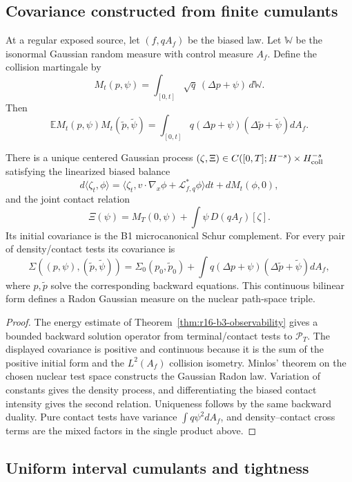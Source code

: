 \subsection{Covariance constructed from finite cumulants}

At a regular exposed source, let \((f,qA_f)\) be the biased law.  Let
\(\mathbb W\) be the isonormal Gaussian random measure with control measure
\(A_f\).  Define the collision martingale by
\[
 M_t(p,\psi)=
 \int_{[0,t]}\sqrt q\,(\Delta p+\psi)\,d\mathbb W.
\]
Then
\[
 \mathbb E M_t(p,\psi)M_t(\tilde p,\tilde\psi)
 =\int_{[0,t]}q(\Delta p+\psi)
   (\Delta\tilde p+\tilde\psi)dA_f.
\]

\begin{theorem}
\label{thm:r16-b3-covariance}
There is a unique centered Gaussian process
\((\zeta,\Xi)\in C([0,T];H^{-s})\times H^{-s}_{\rm coll}\) satisfying the
linearized biased balance
\[
 d\langle\zeta_t,\phi\rangle
 =\langle\zeta_t,
 v\cdot\nabla_x\phi+\mathcal L_{f,q}^*\phi\rangle dt
 +dM_t(\phi,0),
\]
and the joint contact relation
\[
 \Xi(\psi)=M_T(0,\psi)
 +\int\psi\,D(qA_f)[\zeta].
\]
Its initial covariance is the B1 microcanonical Schur complement.  For every
pair of density/contact tests its covariance is
\[
 \Sigma((p,\psi),(\tilde p,\tilde\psi))
 =\Sigma_0(p_0,\tilde p_0)
 +\int q(\Delta p+\psi)(\Delta\tilde p+\tilde\psi)dA_f,
\]
where \(p,\tilde p\) solve the corresponding backward equations.  This
continuous bilinear form defines a Radon Gaussian measure on the nuclear
path-space triple.
\end{theorem}

\begin{proof}
The energy estimate of Theorem~\ref{thm:r16-b3-observability} gives a bounded
backward solution operator from terminal/contact tests to \(\mathcal P_T\).
The displayed covariance is positive and continuous because it is the sum of
the positive initial form and the \(L^2(A_f)\) collision isometry.  Minlos'
theorem on the chosen nuclear test space constructs the Gaussian Radon law.
Variation of constants gives the density process, and differentiating the
biased contact intensity gives the second relation.  Uniqueness follows by the
same backward duality.  Pure contact tests have variance
\(\int q\psi^2dA_f\), and density--contact cross terms are the mixed factors in
the single product above.
\end{proof}

\subsection{Uniform interval cumulants and tightness}

